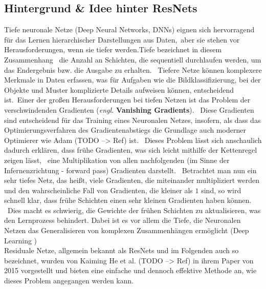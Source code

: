 \subsection{Hintergrund \& Idee hinter \glqq ResNets\grqq{}}\label{subsec:ResNetsBackgroundAndIdea}
Tiefe neuronale Netze (Deep Neural Networks, DNNs) eignen sich hervorragend für das Lernen hierarchischer Darstellungen aus Daten,\
aber sie stehen vor Herausforderungen, wenn sie \glqq tiefer\grqq{} werden.\glqq Tiefe\grqq{} bezeichnet in diesem Zusammenhang \ 
die Anzahl an Schichten, die sequentiell durchlaufen werden, um das Endergebnis bzw. die Ausgabe zu erhalten. \
Tiefere Netze können komplexere Merkmale in Daten erfassen, was für Aufgaben wie die Bildklassifizierung, bei der Objekte und Muster komplizierte Details aufweisen können, entscheidend ist.\
Einer der großen Herausforderungen bei tiefen Netzen ist das Problem der \glqq verschwindenden Gradienten\grqq{} (\textit{engl.} \textbf{Vanishing Gradients}). \
Diese Gradienten sind entscheidend für das Training eines Neuronalen Netzes, insofern, als dass das Optimierungsverfahren des Gradientenabstiegs die Grundlage auch moderner Optimierer wie \glqq Adam\grqq{} (TODO --> Ref) ist. \ 
Dieses Problem lässt sich anschaulich dadurch erklären, dass frühe Gradienten, was sich leicht mithilfe der Kettenregel zeigen lässt, \ 
eine Multiplikation von allen nachfolgenden (im Sinne der Infernenzrichtung - \glqq forward pass\grqq{}) Gradienten darstellt. \
Betrachtet man nun ein sehr tiefes Netz, das heißt, viele Gradienten, die miteinander multipliziert werden und den wahrscheinliche Fall von Gradienten, die kleiner als $1$ sind, so wird schnell klar, dass frühe Schichten einen sehr kleinen Gradienten haben können. \
Dies macht es schwierig, die Gewichte der frühen Schichten zu aktualisieren, was den Lernprozess behindert. Dabei ist es vor allem die Tiefe, die Neuronalen Netzen das Generalisieren von komplexen Zusammenhängen ermöglicht (\glqq Deep Learning \grqq{})\\
Residuale Netze, allgemein bekannt als ResNets und im Folgenden auch so bezeichnet, wurden von Kaiming He et al. (TODO --> Ref) in ihrem Paper von 2015 vorgestellt und bieten eine einfache und dennoch effektive Methode an, wie dieses Problem angegangen werden kann. \
